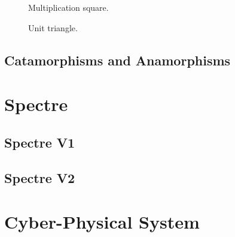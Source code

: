 \begin{figure}[h]
\centering
\begin{minipage}{0.45\textwidth}
 \centering
{}
\caption{Multiplication square.}
\label{fig:MultiplicationSquare}
\end{minipage}
 \begin{minipage}{0.45\textwidth}
 \centering
{}
\caption{Unit triangle.}
\label{fig:UnitTriangle}
  \end{minipage}
\end{figure}





\subsection{Catamorphisms and Anamorphisms}
\section{Spectre}
\label{sec:Preliminaries:Spectre}
\subsection{Spectre V1}
\subsection{Spectre V2}
\section{Cyber-Physical System} 
